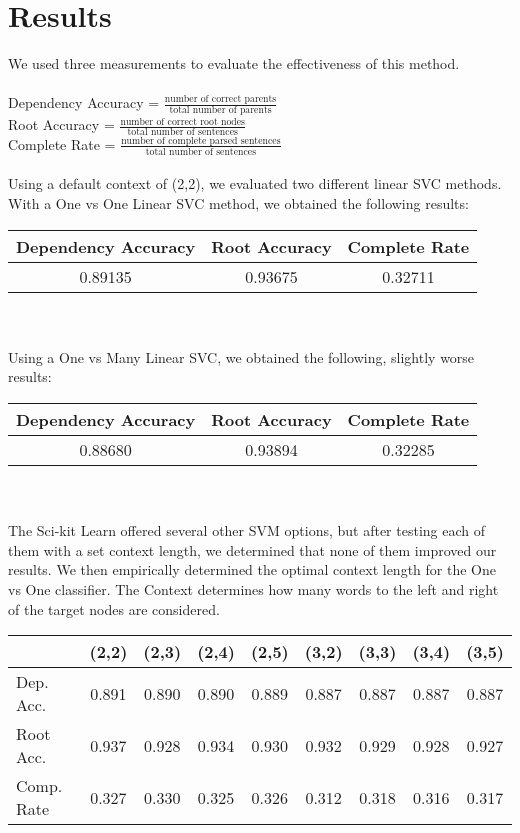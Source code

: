 \documentclass[12pt,fleqn]{amsart}
\begin{document}
\section{Results}
We used three measurements to evaluate the effectiveness of this method.\\

\noindent \\
Dependency Accuracy = $\frac{\text{number of correct parents}}{\text{total number of parents}}$\\
Root Accuracy = $\frac{\text{number of correct root nodes}}{\text{total number of sentences}}$\\
Complete Rate  = $\frac{\text{number of complete parsed sentences}}{\text{total number of sentences}}$\\

\noindent \\
Using a default context of (2,2), we evaluated two different linear SVC methods. With a One vs One Linear SVC method, we obtained the following results:\\
        \begin{tabular}{|c|c|c|}
            \hline Dependency Accuracy & Root Accuracy & Complete Rate \\ \hline
            0.89135 & 0.93675 & 0.32711 \\ \hline
        \end{tabular}\\

\noindent \\
Using a One vs Many Linear SVC, we obtained the following, slightly worse results: \\
       \begin{tabular}{|c|c|c|}
            \hline Dependency Accuracy & Root Accuracy & Complete Rate \\ \hline
            0.88680 & 0.93894 & 0.32285 \\ \hline
        \end{tabular} \\
        
\noindent \\        
The Sci-kit Learn offered several other SVM options, but after testing each of them with a set context length, we determined
that none of them improved our results. We then empirically determined the optimal context length for the One vs One classifier. The Context determines how many words to the left and right of the target nodes are considered. \\
\begin{tabular}{|l|cccc|cccc|}
            \cline{2-9} \multicolumn{1}{c|}{} & (2,2) & (2,3) & (2,4) & (2,5) & (3,2) & (3,3) & (3,4) & (3,5) \\ \hline
            Dep. Acc. & 0.891 & 0.890 & 0.890 & 0.889 & 0.887 & 0.887 & 0.887 & 0.887 \\
            Root Acc. & 0.937 & 0.928 & 0.934 & 0.930 & 0.932 & 0.929 & 0.928 & 0.927 \\
            Comp. Rate & 0.327 & 0.330 & 0.325 & 0.326 & 0.312 & 0.318 & 0.316 & 0.317 \\ \hline
\end{tabular}\\
\end{document}
